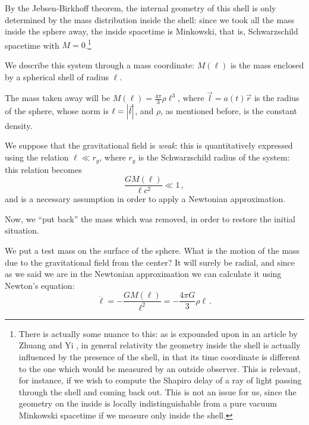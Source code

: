 \documentclass[main.tex]{subfiles}
\begin{document}
By the Jebsen-Birkhoff theorem, the internal geometry of this shell is only determined by the mass distribution inside the shell: since we took all the mass inside the sphere away, the inside spacetime is Minkowski, that is, Schwarzschild spacetime with \(M=0\).\footnote{There is actually some nuance to this: as is expounded upon in an article by Zhuang and Yi \cite{zhangCOMMONMISUNDERSTANDINGBIRKHOFF2012}, in general relativity the geometry inside the shell is actually influenced by the presence of the shell, in that its time coordinate is different to the one which would be measured by an outside observer. This is relevant, for instance, if we wish to compute the Shapiro delay of a ray of light passing through the shell and coming back out.
This is not an issue for us, since the geometry on the inside is locally indistinguishable from a pure vacuum Minkowski spacetime if we measure only inside the shell.}


We describe this system through a mass coordinate: \(M(\ell)\) is the mass enclosed by a spherical shell of radius \(\ell\).

The mass taken away will be \(M(\ell) = \frac{4 \pi}{3} \rho \ell^{3}\), where \(\vec{l} = a(t) \vec{r}\) is the radius of the sphere, whose norm is \(\ell = \abs{\vec{l}}\), and \(\rho \), as mentioned before, is the constant density.

We suppose that the gravitational field is \emph{weak}: this is quantitatively expressed using the relation \(\ell \ll r_g\), where \(r_g\) is the Schwarzschild radius of the system: this relation becomes
%
\begin{equation}
  \frac{GM(\ell)}{\ell c^2} \ll 1\,,
\end{equation}
%
and is a necessary assumption in order to apply a Newtonian approximation.

Now, we ``put back'' the mass which was removed, in order to restore the initial situation.

We put a test mass on the surface of the sphere. What is the motion of the mass due to the gravitational field from the center? It will surely be radial, and since as we said we are in the Newtonian approximation we can calculate it using Newton's equation: 
%
\begin{equation} \label{eq:newtonian-approx-acceleration}
\ddot{\ell} = - \frac{GM(\ell)}{\ell^2} = - \frac{4 \pi G}{3} \rho \ell
\,.
\end{equation}
\end{document}
